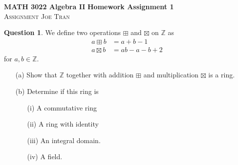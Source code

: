 \documentclass[11pt]{amsart}
\theoremstyle{definition}\newtheorem{question}{Question}
\theoremstyle{definition}\newtheorem{claim}{Claim}
\theoremstyle{remark}\newtheorem*{solution}{Solution}
\newcommand{\Z}{\mathbb{Z}}
\begin{document}
\noindent \textbf{MATH 3022 Algebra II} \hfill \textbf{Homework Assignment 1} \\
\textsc{Assignment} \hfill \textsc{Joe Tran}

\begin{question}\label{question:1}
    We define two operations $\boxplus$ and $\boxtimes$ on $\Z$ as
    \begin{align*}
        a \boxplus b &= a + b - 1 \\
        a \boxtimes b &= ab - a - b + 2
    \end{align*}
    for $a, b \in \Z$.
    \begin{itemize}
        \item[(a)] Show that $\Z$ together with addition $\boxplus$ and multiplication $\boxtimes$ is a ring.
        \item[(b)] Determine if this ring is
        \begin{itemize}
            \item[(i)] A commutative ring
            \item[(ii)] A ring with identity
            \item[(iii)] An integral domain.
            \item[(iv)] A field.
        \end{itemize}
    \end{itemize}
\end{question}
\end{document}
